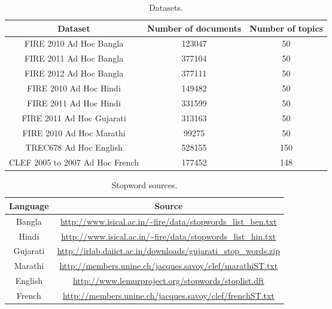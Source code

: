 \documentclass[sigconf]{acmart}
\begin{document}
\begin{table*}
 \begin{tabular}{|c|c|c|}
 \hline
 \textbf{Dataset}  & \textbf{Number of documents} & \textbf{Number of topics}\\
 \hline
 \hline
FIRE 2010 Ad Hoc Bangla & 123047 & 50\\ \hline
FIRE 2011 Ad Hoc Bangla & 377104 & 50\\ \hline
FIRE 2012 Ad Hoc Bangla & 377111 & 50\\ \hline
\hline

FIRE 2010 Ad Hoc Hindi & 149482 & 50\\ \hline
FIRE 2011 Ad Hoc Hindi & 331599 & 50\\ \hline
\hline
FIRE 2011 Ad Hoc Gujarati & 313163 & 50\\ \hline
\hline
FIRE 2010 Ad Hoc Marathi & 99275 & 50\\ \hline
\hline
TREC678 Ad Hoc English & 528155 & 150\\ \hline
\hline
CLEF 2005 to 2007 Ad Hoc French & 177452 & 148\\
\hline
  
\end{tabular}

\caption{Datasets.}
\end{table*}

\begin{table*}
 \begin{tabular}{|c|c|}
 \hline
 \textbf{Language}  & \textbf{Source}\\
 \hline
 \hline
Bangla & \url{http://www.isical.ac.in/~fire/data/stopwords_list_ben.txt}\\
\hline
Hindi & \url{http://www.isical.ac.in/~fire/data/stopwords_list_hin.txt}\\
\hline
Gujarati & \url{http://irlab.daiict.ac.in/downloads/gujarati_stop_words.zip}\\ 
\hline
Marathi & \url{http://members.unine.ch/jacques.savoy/clef/marathiST.txt}\\
\hline
English & \url{http://www.lemurproject.org/stopwords/stoplist.dft}\\
\hline
French & \url{http://members.unine.ch/jacques.savoy/clef/frenchST.txt}\\
\hline
  
\end{tabular}

\caption{Stopword sources.}
\end{table*}
\end{document}
